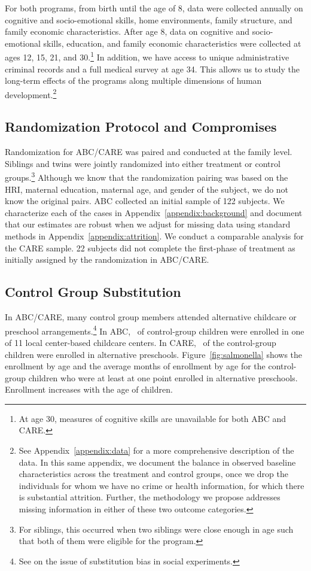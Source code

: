 For both programs, from birth until the age of 8, data were collected annually on cognitive and socio-emotional skills, home environments, family structure, and family economic characteristics. After age 8, data on cognitive and socio-emotional skills, education, and family economic characteristics were collected at ages 12, 15, 21, and 30.\footnote{At age 30, measures of cognitive skills are unavailable for both ABC and CARE.} In addition, we have access to unique administrative criminal records and a full medical survey at age 34. This allows us to study the long-term effects of the programs along multiple dimensions of human development.\footnote{See Appendix~\ref{appendix:data} for a more comprehensive description of the data. In this same appendix, we document the balance in observed baseline characteristics across the treatment and control groups, once we drop the individuals for whom we have no crime or health information, for which there is substantial attrition. Further, the methodology we propose addresses missing information in either of these two outcome categories.}

\subsection{Randomization Protocol and Compromises} \label{section:randomization}

Randomization for ABC/CARE was paired and conducted at the family level. Siblings and twins were jointly randomized into either treatment or control groups.\footnote{For siblings, this occurred when two siblings were close enough in age such that both of them were eligible for the program.} Although we know that the randomization pairing was based on the HRI, maternal education, maternal age, and gender of the subject, we do not know the original pairs. ABC collected an initial sample of 122 subjects. We characterize each of the cases in Appendix~\ref{appendix:background} and document that our estimates are robust when we adjust for missing data using standard methods in Appendix~\ref{appendix:attrition}. We conduct a comparable analysis for the CARE sample. 22 subjects did not complete the first-phase of treatment as initially assigned by the randomization in ABC/CARE. 

\subsection{Control Group Substitution}

In ABC/CARE, many control group members attended alternative childcare or preschool arrangements.\footnote{See \cite{Heckman_Hohmann_etal_2000_QJE} on the issue of substitution bias in social experiments.} In ABC, \treatsubsabc\ of control-group children were enrolled in one of 11 local center-based childcare centers. In CARE, \treatsubscarec\ of the control-group children were enrolled in alternative preschools. Figure~\ref{fig:salmonella} shows the enrollment by age and the average months of enrollment by age for the control-group children who were at least at one point enrolled in alternative preschools. Enrollment increases with the age of children.

